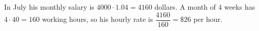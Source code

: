 In July his monthly salary is $4000\cdot1.04=4160$ dollars. A month of $4$ weeks has $4\cdot40=160$ working hours, so his hourly rate is $\dfrac{4160}{160}=\boxed{\$26}$ per hour.
